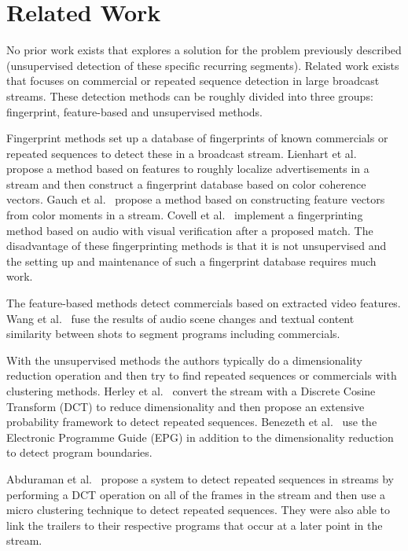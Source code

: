 \documentclass{article}
\begin{document}
\section{Related Work} \label{relatedwork}

No prior work exists that explores a solution for the problem previously described (unsupervised detection of these specific recurring segments). Related work exists that focuses on commercial or repeated sequence detection in large broadcast streams. These detection methods can be roughly divided into three groups: fingerprint, feature-based and unsupervised methods. 

Fingerprint methods set up a database of fingerprints of known commercials or repeated sequences to detect these in a broadcast stream. Lienhart et al.\ \cite{lienhart1997detection} propose a method based on features to roughly localize advertisements in a stream and then construct a fingerprint database based on color coherence vectors. Gauch et al.\ \cite{gauch2006finding} propose a method based on constructing feature vectors from color moments in a stream. Covell et al.\ \cite{covell2006advertisement} implement a fingerprinting method based on audio with visual verification after a proposed match. The disadvantage of these fingerprinting methods is that it is not unsupervised and the setting up and maintenance of such a fingerprint database requires much work.


The feature-based methods detect commercials based on extracted video features. Wang et al.\ \cite{wang2008multimodal} fuse the results of audio scene changes and textual content similarity between shots to segment programs including commercials.

With the unsupervised methods the authors typically do a dimensionality reduction operation and then try to find repeated sequences or commercials with clustering methods. Herley et al.\ \cite{herley2006argos} convert the stream with a Discrete Cosine Transform (DCT) to reduce dimensionality and then propose an extensive probability framework to detect repeated sequences. Benezeth et al.\ \cite{benezeth2010unsupervised} use the Electronic Programme Guide (EPG) in addition to the dimensionality reduction to detect program boundaries.

Abduraman et al.\ \cite{abduraman2011unsupervised} propose a system to detect repeated sequences in streams by performing a DCT operation on all of the frames in the stream and then use a micro clustering technique to detect repeated sequences. They were also able to link the trailers to their respective programs that occur at a later point in the stream.
\end{document}
